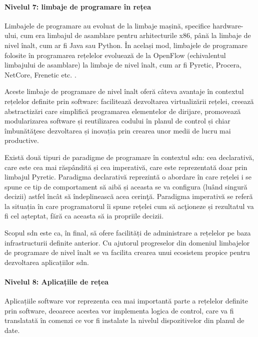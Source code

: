 \paragraph{Nivelul 7: limbaje de programare în rețea}

Limbajele de programare au evoluat de la limbaje mașină, specifice hardware-ului, cum era limbajul de asamblare pentru arhitecturile x86, până la limbaje de nivel înalt, cum ar fi Java sau Python. În același mod, limbajele de programare folosite în programarea rețelelor evoluează de la OpenFlow (echivalentul limbajului de asamblare) la limbaje de nivel înalt, cum ar fi Pyretic, Procera, NetCore, Frenetic etc. \cite{reich2013modular, voellmy2012procera, monsanto2012compiler}.

Aceste limbaje de programare de nivel înalt oferă câteva avantaje în contextul rețelelor definite prin software: facilitează dezvoltarea virtualizării rețelei, creează abstractizări care simplifică programarea elementelor de dirijare, promovează modularizarea software și reutilizarea codului în planul de control și chiar îmbunătăţesc dezvoltarea și inovația prin crearea unor medii de lucru mai productive.

Există două tipuri de paradigme de programare în contextul \gls{sdn}: cea declarativă, care este cea mai răspândită și cea imperativă, care este reprezentată doar prin limbajul Pyretic. Paradigma declarativă reprezintă o abordare în care rețelei i se spune ce tip de comportament să aibă și aceasta se va configura (luând singură decizii) astfel încât să îndeplinească acea cerinţă. Paradigma imperativă se referă la situația în care programatorul îi spune rețelei cum să acţioneze și rezultatul va fi cel așteptat, fără ca aceasta să ia propriile decizii.

Scopul \gls{sdn} este ca, în final, să ofere facilități de administrare a rețelelor pe baza infrastructurii definite anterior. Cu ajutorul progreselor din domeniul limbajelor de programare de nivel înalt se va facilita crearea unui ecosistem propice pentru dezvoltarea aplicațiilor \gls{sdn}.

\paragraph{Nivelul 8: Aplicațiile de rețea}

Aplicațiile software vor reprezenta cea mai importantă parte a rețelelor definite prin software, deoarece acestea vor implementa logica de control, care va fi translatată în comenzi ce vor fi instalate la nivelul dispozitivelor din planul de date.

